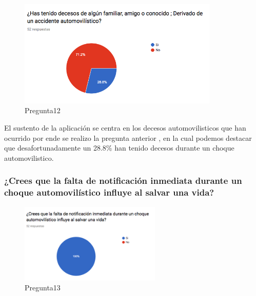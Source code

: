 \begin{figure}[htbp!]
	\begin{center}
		\includegraphics[width=0.85\textwidth]{DisenoEstructura/imagenes/Pregunta12}
		\caption{Pregunta12}
		\label{DE/FO/Pregunta12}
	\end{center}
\end{figure}

El sustento de la aplicación se centra en los decesos automovilisticos que han ocurrido por ende se realizo la pregunta anterior , en la cual podemos destacar que desafortunadamente un 28.8\% han tenido decesos durante un choque automovilistico.\\

\subsubsection{¿Crees que la falta de notificación inmediata durante un choque automovilístico influye al salvar una vida?}

\begin{figure}[htbp!]
	\begin{center}
		\includegraphics[width=0.6\textwidth]{DisenoEstructura/imagenes/Pregunta13}
		\caption{Pregunta13}
		\label{DE/FO/Pregunta13}
	\end{center}
\end{figure}

